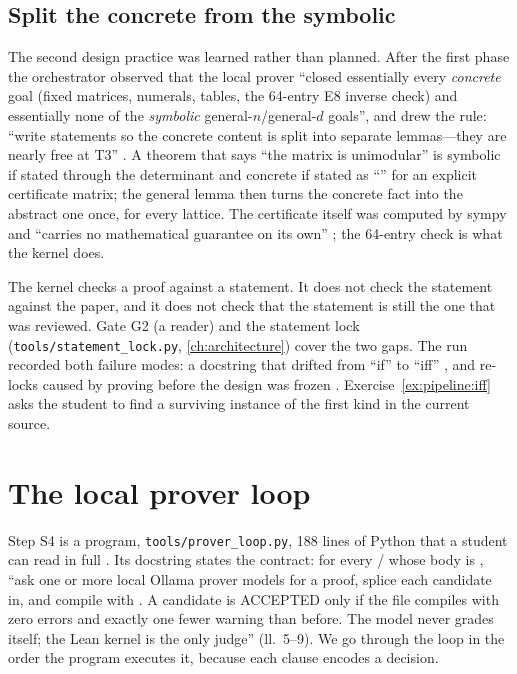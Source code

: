 \subsection{Split the concrete from the symbolic}\label{sec:pipeline:split}

The second design practice was learned rather than planned. After the first phase the
orchestrator observed that the local prover ``closed essentially every \emph{concrete} goal
(fixed matrices, numerals,  tables, the 64-entry E8 inverse check) and
essentially none of the \emph{symbolic} general-$n$/general-$d$ goals'', and drew the rule:
``write statements so the concrete content is split into separate lemmas---they are nearly
free at T3'' . A theorem that says ``the matrix
 is unimodular'' is symbolic if stated through the determinant and concrete
if stated as ``'' for an explicit certificate matrix; the
general lemma  then turns the concrete fact into the
abstract one once, for every lattice. The certificate itself was computed by sympy and
``carries no mathematical guarantee on its own'' ; the
64-entry check is what the kernel does.

\begin{pitfallbox}
The kernel checks a proof against a statement. It does not check the statement against the
paper, and it does not check that the statement is still the one that was reviewed. Gate G2
(a reader) and the statement lock (\texttt{tools/statement\_lock.py}, \cref{ch:architecture})
cover the two gaps. The run recorded both failure modes: a docstring that drifted from
``if'' to ``iff'' , and re-locks caused by proving before
the design was frozen . Exercise~\ref{ex:pipeline:iff}
asks the student to find a surviving instance of the first kind in the current source.
\end{pitfallbox}

\section{The local prover loop}\label{sec:pipeline:loop}

Step S4 is a program, \texttt{tools/prover\_loop.py}, 188 lines of Python that a student can
read in full . Its docstring states the contract:
for every / whose body is , ``ask one or more local
Ollama prover models for a proof, splice each candidate in, and compile with . A candidate is ACCEPTED only if the file compiles with zero errors and exactly one
fewer  warning than before. The model never grades itself; the Lean kernel is the
only judge'' (ll.~5--9). We go through the loop in the order the program executes it,
because each clause encodes a decision.

